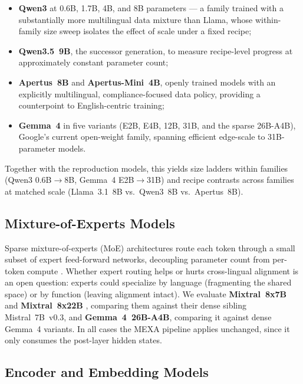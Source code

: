 \begin{itemize}
    \item \textbf{Qwen3} \citep{yang2025qwen3} at 0.6B, 1.7B, 4B, and 8B
    parameters --- a family trained with a substantially more multilingual
    data mixture than Llama, whose within-family size sweep isolates the
    effect of scale under a fixed recipe;
    \item \textbf{Qwen3.5~9B}, the successor generation, to measure
    recipe-level progress at approximately constant parameter count;
    \item \textbf{Apertus~8B} and \textbf{Apertus-Mini~4B}, openly trained
    models with an explicitly multilingual, compliance-focused data
    policy, providing a counterpoint to English-centric training;
    \item \textbf{Gemma~4} in five variants (E2B, E4B, 12B, 31B, and the
    sparse 26B-A4B), Google's current open-weight family, spanning
    efficient edge-scale to 31B-parameter models.
\end{itemize}

\noindent
Together with the reproduction models, this yields size ladders within
families (Qwen3 0.6B$\to$8B, Gemma~4 E2B$\to$31B) and recipe contrasts
across families at matched scale (Llama~3.1~8B vs.\ Qwen3~8B vs.\
Apertus~8B).

\subsection{Mixture-of-Experts Models}
\label{subsec:moe-models}

Sparse mixture-of-experts (MoE) architectures route each token through a
small subset of expert feed-forward networks, decoupling parameter count
from per-token compute \citep{jiang2024mixtral}. Whether expert routing
helps or hurts cross-lingual alignment is an open question: experts could
specialize by language (fragmenting the shared space) or by function
(leaving alignment intact). We evaluate \textbf{Mixtral~8x7B} and
\textbf{Mixtral~8x22B} \citep{jiang2024mixtral}, comparing them against
their dense sibling Mistral~7B~v0.3, and \textbf{Gemma~4~26B-A4B},
comparing it against dense Gemma~4 variants. In all cases the MEXA
pipeline applies unchanged, since it only consumes the post-layer hidden
states.

\subsection{Encoder and Embedding Models}
\label{subsec:encoder-models}

